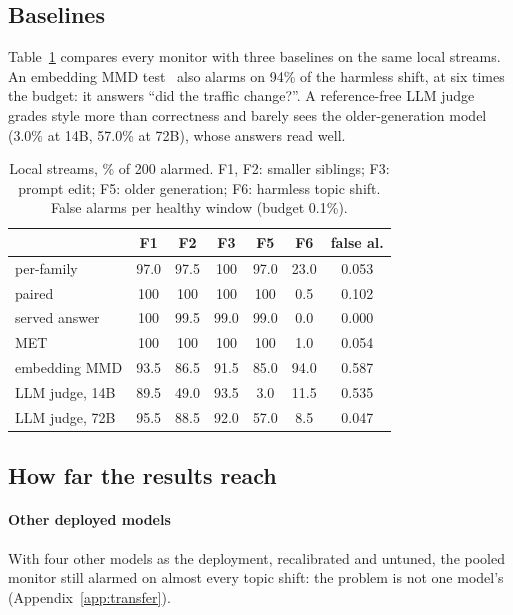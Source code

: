 \documentclass{article}
\begin{document}
\subsection{Baselines}
\label{sec:baselines}

Table~\ref{tab:baselines} compares every monitor with three baselines on the same
local streams. An embedding MMD test~\citep{gretton2012kernel} also alarms on 94\%
of the harmless shift, at six times the budget: it answers ``did the traffic
change?''. A reference-free LLM judge grades style more than correctness and
barely sees the older-generation model (3.0\% at 14B, 57.0\% at 72B), whose answers
read well.

\begin{table}[t]
  \centering\small
  \caption{Local streams, \% of 200 alarmed. F1, F2: smaller siblings; F3: prompt
  edit; F5: older generation; F6: harmless topic shift. False alarms per healthy
  window (budget 0.1\%).}
  \label{tab:baselines}
  \setlength{\tabcolsep}{2.6pt}
  \begin{tabular}{lcccc|cc}
    \toprule
    & F1 & F2 & F3 & F5 & F6 & false al. \\
    \midrule
    per-family    & 97.0 & 97.5 & 100 & 97.0 & 23.0 & 0.053 \\
    paired        & 100 & 100 & 100 & 100 & 0.5 & 0.102 \\
    served answer & 100 & 99.5 & 99.0 & 99.0 & 0.0 & 0.000 \\
    \midrule
    MET           & 100 & 100 & 100 & 100 & 1.0 & 0.054 \\
    embedding MMD & 93.5 & 86.5 & 91.5 & 85.0 & 94.0 & 0.587 \\
    LLM judge, 14B & 89.5 & 49.0 & 93.5 & 3.0 & 11.5 & 0.535 \\
    LLM judge, 72B & 95.5 & 88.5 & 92.0 & 57.0 & 8.5 & 0.047 \\
    \bottomrule
  \end{tabular}
\end{table}

\subsection{How far the results reach}
\label{sec:reach}

\paragraph{Other deployed models} With four other models as the deployment,
recalibrated and untuned, the pooled monitor still alarmed on almost every topic
shift: the problem is not one model's (Appendix~\ref{app:transfer}).
\end{document}
